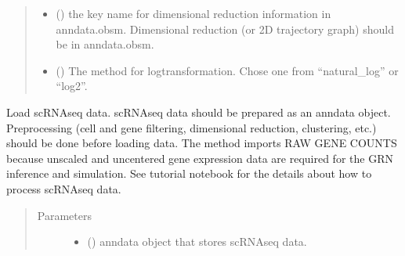 \documentclass[letterpaper,10pt,english]{sphinxmanual}
\begin{document}
\begin{fulllineitems}
\begin{fulllineitems}
\begin{quote}
\begin{description}
\begin{itemize}
\item {} 
 () \textendash{} the key name for dimensional reduction information in anndata.obsm.
Dimensional reduction (or 2D trajectory graph) should be in anndata.obsm.

\item {} 
 () \textendash{} The method for log\sphinxhyphen{}transformation. Chose one from “natural\_log” or “log2”.

\end{itemize}

\end{description}\end{quote}

\end{fulllineitems}


\begin{fulllineitems}
\label{\detokenize{modules/celloracle:celloracle.Oracle.import_anndata_as_raw_count}}
Load scRNA\sphinxhyphen{}seq data. scRNA\sphinxhyphen{}seq data should be prepared as an anndata object.
Preprocessing (cell and gene filtering, dimensional reduction, clustering, etc.) should be done before loading data.
The method imports RAW GENE COUNTS because unscaled and uncentered gene expression data are required for the GRN inference and simulation.
See tutorial notebook for the details about how to process scRNA\sphinxhyphen{}seq data.
\begin{quote}\begin{description}
\item[{Parameters}] \leavevmode\begin{itemize}
\item {} 
 () \textendash{} anndata object that stores scRNA\sphinxhyphen{}seq data.


\end{itemize}
\end{description}
\end{quote}
\end{fulllineitems}
\end{fulllineitems}
\end{document}
